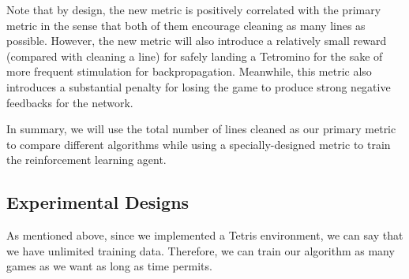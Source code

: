 \documentclass[letterpaper]{article} %
\begin{document}
Note that by design, the new metric is positively correlated with the primary metric in the sense that both of them encourage cleaning as many lines as possible. However, the new metric will also introduce a relatively small reward (compared with cleaning a line) for safely landing a Tetromino for the sake of more frequent stimulation for backpropagation. Meanwhile, this metric also introduces a substantial penalty for losing the game to produce strong negative feedbacks for the network.

In summary, we will use the total number of lines cleaned as our primary metric to compare different algorithms while using a specially-designed metric to train the reinforcement learning agent.
\subsection{Experimental Designs}

As mentioned above, since we implemented a Tetris environment, we can say that we have unlimited training data. Therefore, we can train our algorithm as many games as we want as long as time permits. 
\end{document}
